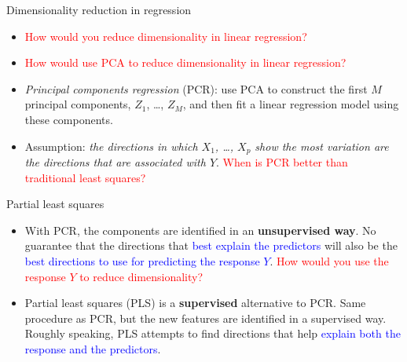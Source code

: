 \documentclass[14pt]{beamer}
\begin{document}
\begin{frame}{\normalsize Dimensionality reduction in regression}


\begin{itemize}
	\item \textcolor{red}{How would you reduce dimensionality in linear regression?}
	\pause
	\item \textcolor{red}{How would use PCA to reduce dimensionality in linear regression?}
	\pause
	\item \emph{Principal components regression} (PCR): use PCA to construct the first $M$ principal components, $Z_1$, \dots, $Z_M$, and then fit a linear regression model using these components.
	\item Assumption: \emph{the directions in which $X_1$, \dots, $X_p$ show the most variation are the directions that are associated with $Y$}. \textcolor{red}{When is PCR better than traditional least squares?}
\end{itemize}

\end{frame}

\begin{frame}{Partial least squares}

\begin{itemize}
\item With PCR, the components are identified in an \textbf{unsupervised way}. No guarantee that the directions that \textcolor{blue}{best explain the predictors} will also be the \textcolor{blue}{best directions to use for predicting the response $Y$}. \textcolor{red}{How would you use the response $Y$ to reduce dimensionality?}
\pause
\item Partial least squares (PLS) is a \textbf{supervised} alternative to PCR. Same procedure as PCR, but the new features are identified in a supervised way. Roughly speaking, PLS attempts to find directions that help \textcolor{blue}{explain both the response and the predictors}.

\end{itemize}

\end{frame}
\end{document}
